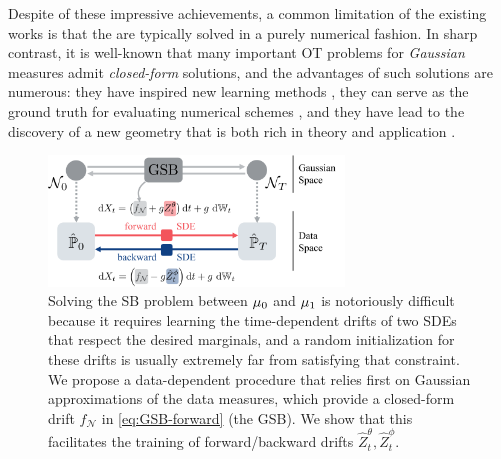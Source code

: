 Despite of these impressive achievements, a common limitation of the existing works is that the  are typically solved in a purely {numerical} fashion. In sharp contrast, it is well-known that many important \acrshort{OT} problems for \emph{Gaussian} measures admit \emph{closed-form} solutions, and the advantages of such solutions are numerous: they have inspired new learning methods \citep{rabin2011wasserstein, vayer2019sliced, bonneel2015sliced}, they can serve as the ground truth for evaluating numerical schemes \citep{janati2020entropic}, and they have lead to the discovery of a new geometry that is both rich in theory and application \citep{takatsu2010wasserstein}. 

\begin{figure}[t]
    \centering
    \includegraphics[width=0.7\textwidth]{figures/fig_overview_gsb.pdf}
    \caption{Solving the \acrshort{SB} problem between $\mu_0$ and $\mu_1$ is notoriously difficult because it requires learning the time-dependent drifts of two SDEs that respect the desired marginals, and a random initialization for these drifts is usually extremely far from satisfying that constraint. We propose a data-dependent procedure that relies first on Gaussian approximations of the data measures, which provide a closed-form drift $f_{\mathcal{N}}$ in \eqref{eq:GSB-forward} (the \acrshort{GSB}). We show that this facilitates the training of forward/backward drifts $\hat{Z}^\theta_t, \hat{Z}^\phi_t$.}
    \label{fig:overview_gsbflow}
\end{figure}

